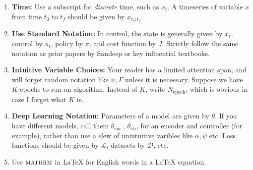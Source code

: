 \begin{enumerate}
    \item \textbf{Time: } Use a subscript for \textit{discrete} time, such as $x_t$. A timeseries of variable $x$ from time $t_0$ to $t_f$ should be given by $x_{t_0:t_f}$.
    \item \textbf{Use Standard Notation: } In control, the state is generally given by $x_t$, control by $u_t$, policy by $\pi$, and cost function by $J$. Strictly follow the same notation as prior papers by Sandeep or key influential textbooks.
    \item \textbf{Intuitive Variable Choices: } Your reader has a limited attention span, and will forget random notation like $\psi, \Gamma$ unless it is necessary. Suppose we have $K$ epochs to run an algorithm. Instead of $K$, write $N_{\mathrm{epoch}}$, which is obvious in case I forget what $K$ is.
    \item \textbf{Deep Learning Notation: } Parameters of a model are given by $\theta$. If you have different models, call them $\theta_{\mathrm{enc.}}$, $\theta_{\mathrm{ctrl}}$ for an encoder and controller (for example), rather than use a slew of unintuitive varibles like $\alpha, \psi$ etc. Loss functions should be given by $\mathcal{L}$, datasets by $\mathcal{D}$, etc.
    \item Use $\textsc{mathrm}$ in LaTeX for English words in a LaTeX equation.
\end{enumerate}

